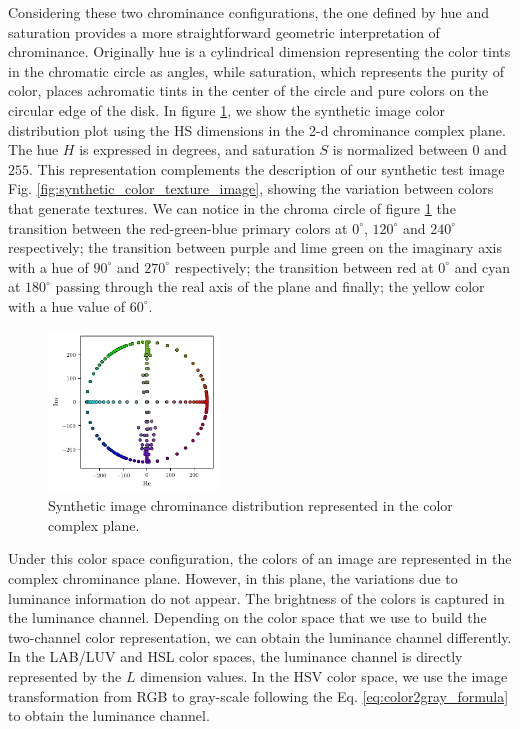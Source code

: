 \documentclass[journal]{IEEEtran}
\begin{document}
Considering these two chrominance configurations, the one defined by hue and saturation provides a more straightforward geometric interpretation of chrominance. Originally hue is a cylindrical dimension representing the color tints in the chromatic circle as angles, while saturation, which represents the purity of color, places achromatic tints in the center of the circle and pure colors on the circular edge of the disk. In figure \ref{fig:color_complex_plane}, we show the synthetic image color distribution plot using the HS dimensions in the 2-d chrominance complex plane. The hue $H$ is expressed in degrees, and saturation $S$ is normalized between $0$ and $255$. This representation complements the description of our synthetic test image Fig. \ref{fig:synthetic_color_texture_image}, showing the variation between colors that generate textures. We can notice in the chroma circle of figure \ref{fig:color_complex_plane} the transition between the red-green-blue primary colors at $0^\circ$, $120^\circ$ and $240^\circ$ respectively; the transition between purple and lime green on the imaginary axis with a hue of $90^\circ$ and $270^\circ$ respectively; the transition between red at $0^\circ$ and cyan at $180^\circ$ passing through the real axis of the plane and finally; the yellow color with a hue value of $60^\circ$.

\begin{figure}[!ht]
	\centering
    \includegraphics[width=0.4\textwidth]{color_complex_plane}
	\caption{Synthetic image chrominance distribution represented in the color complex plane.}\label{fig:color_complex_plane}
\end{figure}

Under this color space configuration, the colors of an image are represented in the complex chrominance plane. However, in this plane, the variations due to luminance information do not appear. The brightness of the colors is captured in the luminance channel. Depending on the color space that we use to build the two-channel color representation, we can obtain the luminance channel differently. In the LAB/LUV and HSL color spaces, the luminance channel is directly represented by the $L$ dimension values. In the HSV color space, we use the image transformation from RGB to gray-scale following the Eq. \eqref{eq:color2gray_formula} to obtain the luminance channel.
\end{document}

